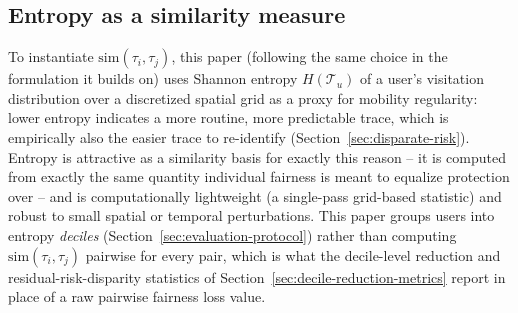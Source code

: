 \subsection{Entropy as a similarity measure}
To instantiate $\mathrm{sim}(\tau_i,\tau_j)$, this paper (following the
same choice in the formulation it builds on) uses Shannon entropy
$H(\mathcal{T}_u)$ of a user's visitation distribution over a
discretized spatial grid as a proxy for mobility regularity: lower
entropy indicates a more routine, more predictable trace, which is
empirically also the easier trace to re-identify
(Section~\ref{sec:disparate-risk}). Entropy is attractive as a
similarity basis for exactly this reason -- it is computed from
exactly the same quantity individual fairness is meant to equalize
protection over -- and is computationally lightweight (a single-pass
grid-based statistic) and robust to small spatial or temporal
perturbations. This paper groups users into entropy \emph{deciles}
(Section~\ref{sec:evaluation-protocol}) rather than computing
$\mathrm{sim}(\tau_i,\tau_j)$ pairwise for every pair, which is what the
decile-level reduction and residual-risk-disparity statistics of
Section~\ref{sec:decile-reduction-metrics} report in place of a raw
pairwise fairness loss value.
